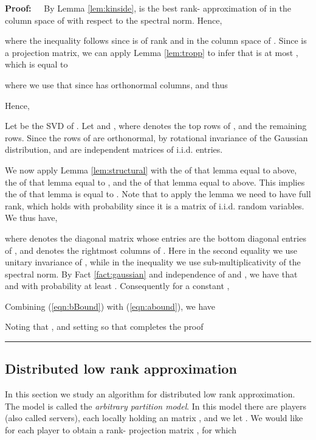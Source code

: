 \documentclass[11pt]{article}
\newenvironment{proof}{\begin{trivlist} \item {\bf Proof:~~}}
  {\qed\end{trivlist}}
\def\qed{\hfill\rule{2mm}{2mm}}
\begin{document}
\begin{proof}
By Lemma \ref{lem:kinside},  is the best rank- approximation of  in the column space of 
with respect to the spectral norm. Hence, 

where the inequality follows since  is of rank  and in the column space of . Since
 is a projection matrix, we can apply Lemma \ref{lem:tropp} to infer that  is at most
 , which is
equal to
 
where we use that  since  has orthonormal columns, and thus

Hence, 


Let  be the SVD of . Let 
and , where  denotes the top  rows of , and  the remaining
 rows. Since the rows of  are orthonormal, by rotational invariance of the Gaussian distribution,
 and  are independent matrices of i.i.d.  entries. 

We now apply Lemma \ref{lem:structural} with the  of that lemma equal to  above, the  of that
lemma equal to , and the  of that lemma equal to  above. This implies the  of that
lemma is equal to . Note that to apply the lemma we need  to have full rank, which holds with probability
 since it is a  matrix of i.i.d.  random variables. We thus have, 

where  denotes the  diagonal matrix whose entries are the bottom  diagonal
entries of , and  denotes the rightmost  columns of . Here 
in the second equality we use unitary invariance of , while in the inequality we use
sub-multiplicativity of the spectral norm. By Fact \ref{fact:gaussian} and independence of  and
, we have that  and 
with probability at least . Consequently for a constant , 

Combining (\ref{eqn:bBound}) with (\ref{eqn:abound}), we have

Noting that , and setting  so that
 completes the proof
\end{proof}

\subsection{Distributed low rank approximation}\label{sec:dislra}
In this section we study an algorithm for distributed low rank approximation. The model is called the 
{\it arbitrary partition model}. In this model there are  players (also called servers), 
each locally holding an  
matrix , and we let . We would like for each player to obtain a rank- projection
matrix , for which 
\end{document}
